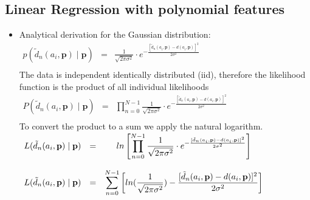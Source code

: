 \documentclass{article}
\begin{document}
    

\subsection{Linear Regression with polynomial features}

\begin{itemize}

    \item Analytical derivation for the Gaussian distribution:\\
  
	    $\begin{array}{ccc}
	        p(\tilde{d}_n(a_i,\mathbf{p})\mid\mathbf{p}) & = & \frac{1}{\sqrt{2\pi\sigma^2}} \cdot e^{- \frac{[\tilde{d}_n(a_i,\mathbf{p})-d(a_i,\mathbf{p})]^2}{2\sigma^2}} \\  
	    \end{array}$\\
	    
	    The data is independent identically distributed (iid), therefore the likelihood function is the product of all individual likelihoods\\
	    
	    $\begin{array}{ccc}
	        P(\tilde{d}_n(a_i,\mathbf{p})\mid\mathbf{p}) & = & \displaystyle \prod_{n=0}^{N-1} \frac{1}{\sqrt{2\pi\sigma^2}} \cdot e^{- \frac{[\tilde{d}_n(a_i,\mathbf{p})-d(a_i,\mathbf{p})]^2}{2\sigma^2}} \\

	    \end{array}$\\
	  
	    To convert the product to a sum we apply the natural logarithm.\\
	  
	    $\begin{array}{cccl}
	        L(\tilde{d}_n(a_i,\mathbf{p})\mid\mathbf{p}) & = & ln \left[ \displaystyle \displaystyle \prod_{n=0}^{N-1} \frac{1}{\sqrt{2\pi\sigma^2}} \cdot e^{- \frac{[\tilde{d}_n(a_i,\mathbf{p})-d(a_i,\mathbf{p})]^2}{2\sigma^2}} \right] & \\\\
	        L(\tilde{d}_n(a_i,\mathbf{p})\mid\mathbf{p}) & = & \displaystyle \sum_{n=0}^{N-1} \left[ ln(\frac{1}{\sqrt{2\pi\sigma^2}}) - \frac{[\tilde{d}_n(a_i,\mathbf{p})-d(a_i,\mathbf{p})]^2}{2\sigma^2} \right] & \\
	    \end{array}$\\
	  

\end{itemize}
\end{document}

